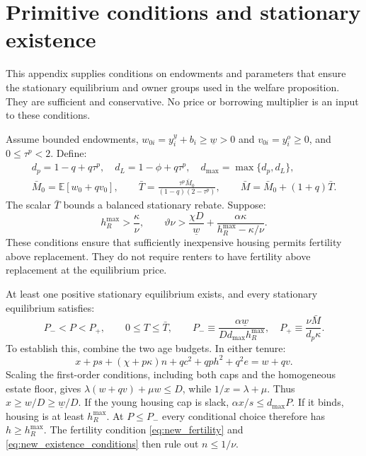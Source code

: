 \documentclass[11pt]{article}
\begin{document}
\appendix
\section{Primitive conditions and stationary existence}
\label{app:new_existence}

This appendix supplies conditions on endowments and parameters that ensure
the stationary equilibrium and owner groups used in the welfare proposition.
They are sufficient and conservative. No price or borrowing multiplier is an
input to these conditions.

Assume bounded endowments, $w_{0i}=y_i^y+b_i\ge\underline w>0$ and
$v_{0i}=y_i^o\ge0$, and $0\le\tau^p<2$. Define:
\begin{equation}
\begin{gathered}
d_p=1-q+q\tau^p,\quad d_L=1-\phi+q\tau^p,\quad
d_{\max}=\max\{d_p,d_L\},\\
\bar M_0=\mathbb E[w_0+qv_0],\qquad
\bar T=\frac{\tau^p\bar M_0}{(1-q)(2-\tau^p)},\qquad
\bar M=\bar M_0+(1+q)\bar T.
\end{gathered}
\end{equation}
The scalar $\bar T$ bounds a balanced stationary rebate. Suppose:
\begin{equation}
h_R^{\max}>\frac\kappa\nu,\qquad
\vartheta\nu>\frac{\chi D}{\underline w}
 +\frac{\alpha\kappa}{h_R^{\max}-\kappa/\nu}.
\label{eq:new_existence_conditions}
\end{equation}
These conditions ensure that sufficiently inexpensive housing permits
fertility above replacement. They do not require renters to have fertility
above replacement at the equilibrium price.

At least one positive stationary equilibrium exists, and every stationary
equilibrium satisfies:
\begin{equation}
P_-<P<P_+,\qquad 0\le T\le\bar T,\qquad
P_-\equiv\frac{\alpha\underline w}{D d_{\max}h_R^{\max}},\quad
P_+\equiv\frac{\nu\bar M}{d_p\kappa}.
\label{eq:new_price_bounds}
\end{equation}
To establish this, combine the two age budgets. In either tenure:
\begin{equation}
x+ps+(\chi+p\kappa)n+qc^2+qp h^2+q^2e=w+qv.
\label{eq:new_lifetime_full}
\end{equation}
Scaling the first-order conditions, including both caps and the homogeneous
estate floor, gives $\lambda(w+qv)+\mu w\le D$, while
$1/x=\lambda+\mu$. Thus $x\ge w/D\ge\underline w/D$.
If the young housing cap is slack, $\alpha x/s\le d_{\max}P$. If it binds,
housing is at least $h_R^{\max}$. At $P\le P_-$ every conditional choice
therefore has $h\ge h_R^{\max}$. The fertility condition
\eqref{eq:new_fertility} and \eqref{eq:new_existence_conditions} then rule out
$n\le1/\nu$.
\end{document}
